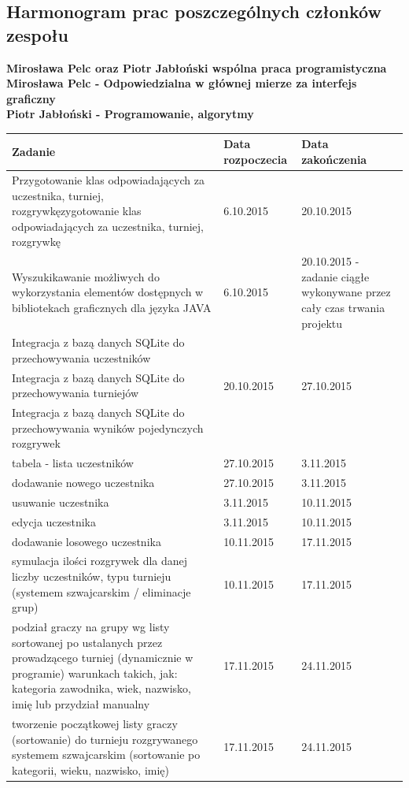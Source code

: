 \subsection{Harmonogram prac poszczególnych członków zespołu}
\textbf{Mirosława Pelc oraz Piotr Jabłoński wspólna praca programistyczna\\
Mirosława Pelc - Odpowiedzialna w głównej mierze za interfejs graficzny\\
Piotr Jabłoński - Programowanie, algorytmy\\}
\begin{tabular}{|p{9cm}|l|p{3cm}|} \hline
Zadanie & Data rozpoczecia & Data zakończenia\\ \hline
Przygotowanie klas odpowiadających za uczestnika, turniej, rozgrywkęzygotowanie klas odpowiadających za uczestnika, turniej, rozgrywkę & 6.10.2015 & 20.10.2015 \\ \hline
Wyszukikawanie możliwych do wykorzystania elementów dostępnych w bibliotekach graficznych dla języka JAVA& 6.10.2015 & 20.10.2015 - zadanie ciągłe wykonywane przez cały czas trwania projektu\\ \hline
Integracja z bazą danych SQLite do przechowywania uczestników& &\\
Integracja z bazą danych SQLite do przechowywania turniejów&20.10.2015&27.10.2015\\
Integracja z bazą danych SQLite do przechowywania wyników pojedynczych rozgrywek&&\\ \hline
tabela - lista uczestników&27.10.2015&3.11.2015\\ \hline
dodawanie nowego uczestnika&27.10.2015&3.11.2015\\ \hline
usuwanie uczestnika&3.11.2015&10.11.2015\\ \hline
edycja uczestnika&3.11.2015&10.11.2015\\ \hline
dodawanie losowego uczestnika&10.11.2015&17.11.2015\\ \hline
symulacja ilości rozgrywek dla danej liczby uczestników, typu turnieju (systemem szwajcarskim / eliminacje grup)&10.11.2015&17.11.2015\\ \hline
podział graczy na grupy wg listy sortowanej po ustalanych przez prowadzącego turniej (dynamicznie w programie) warunkach takich, jak: kategoria zawodnika, wiek, nazwisko, imię lub przydział manualny&17.11.2015&24.11.2015\\ \hline
tworzenie początkowej listy graczy (sortowanie) do turnieju rozgrywanego systemem szwajcarskim (sortowanie po kategorii, wieku, nazwisko, imię)&17.11.2015&24.11.2015\\ \hline

\end{tabular}
